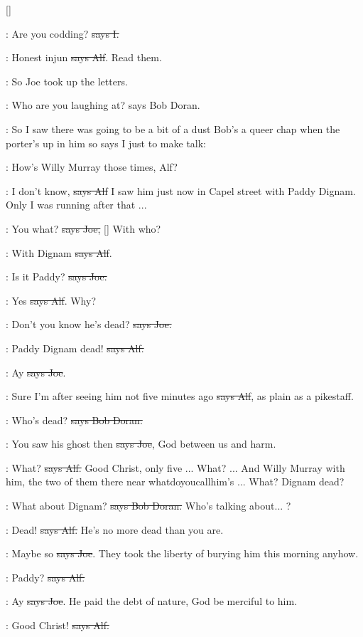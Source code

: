 []

:
Are you codding? \sout{says I.}

\bergan:
Honest injun \sout{says Alf}. Read them.

\Nq:
So Joe took up the letters.

\doran:
Who are you laughing at? says Bob Doran.

\Nq:
So I saw there was going to be a bit of a dust Bob's a queer chap
when the porter's up in him so says I just to make talk:

:
How's Willy Murray those times, Alf?

\bergan:
I don't know, \sout{says Alf}
I saw him just now in Capel street with Paddy
Dignam. Only I was running after that ...

\joe:
You what?
\sout{says Joe,} []
With who?

\bergan:
With Dignam \sout{says Alf}.

\joe:
Is it Paddy? \sout{says Joe.}

\bergan:
Yes \sout{says Alf}. Why?

\joe:
Don't you know he's dead? \sout{says Joe.}

\bergan:
Paddy Dignam dead! \sout{says Alf.}

\joe:
Ay \sout{says Joe}.

\bergan:
Sure I'm after seeing him not five minutes ago
\sout{says Alf}, as plain as a pikestaff.

\doran:
Who's dead? \sout{says Bob Doran.}

\joe:
You saw his ghost then \sout{says Joe},
God between us and harm.

\bergan:
What? \sout{says Alf.} Good Christ, only five ...
What? ... And Willy Murray
with him, the two of them there near whatdoyoucallhim's ... What?
Dignam dead?

\doran:
What about Dignam? \sout{says Bob Doran.}
Who's talking about... ?

\bergan:
Dead! \sout{says Alf.}
He's no more dead than you are.

\joe:
Maybe so \sout{says Joe}.
They took the liberty of burying him this morning
anyhow.

\bergan:
Paddy? \sout{says Alf.}

\joe:
Ay \sout{says Joe}.
He paid the debt of nature, God be merciful to him.

\bergan:
Good Christ! \sout{says Alf.}

